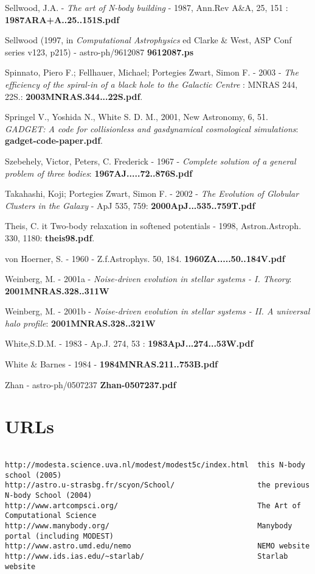 Sellwood, J.A. - {\it The art of N-body building} - 1987, Ann.Rev A\&A, 25, 151 : 
{\bf 1987ARA+A..25..151S.pdf}



Sellwood (1997, in {\it Computational Astrophysics} 
ed Clarke \& West,  ASP  Conf  series  v123, p215) - astro-ph/9612087
{\bf 9612087.ps}

Spinnato, Piero F.; Fellhauer, Michael; Portegies Zwart, Simon F. - 2003 -
{\it The efficiency of the spiral-in of a black hole to the Galactic Centre} :
MNRAS 244, 22S.: {\bf 2003MNRAS.344...22S.pdf}.

Springel V., Yoshida N., White S. D. M., 2001, New Astronomy, 6, 51. 
{\it GADGET: A code for collisionless and gasdynamical cosmological simulations}:
{\bf gadget-code-paper.pdf}.

Szebehely, Victor, Peters, C. Frederick - 1967 - 
{\it Complete solution of a general problem of three bodies}:
{\bf 1967AJ.....72..876S.pdf}

Takahashi, Koji; Portegies Zwart, Simon F. - 2002 -
{\it The Evolution of Globular Clusters in the Galaxy} - ApJ 535, 759:
{\bf 2000ApJ...535..759T.pdf}

Theis, C. {it  Two-body relaxation in softened potentials} - 1998, Astron.Astroph. 330, 1180:
{\bf theis98.pdf}.

von Hoerner, S. - 1960 - Z.f.Astrophys. 50, 184.
{\bf 1960ZA.....50..184V.pdf}


Weinberg, M. - 2001a - 
{\it Noise-driven evolution in stellar systems - I. Theory}:
{\bf 2001MNRAS.328..311W}

Weinberg, M. - 2001b - 
{\it Noise-driven evolution in stellar systems - II. A universal halo profile}:
{\bf 2001MNRAS.328..321W}


White,S.D.M. - 1983 - Ap.J. 274, 53 : {\bf 1983ApJ...274...53W.pdf}

White \& Barnes - 1984 - {\bf 1984MNRAS.211..753B.pdf}

Zhan - astro-ph/0507237 {\bf Zhan-0507237.pdf}

\section*{URLs}

\begin{verbatim}

http://modesta.science.uva.nl/modest/modest5c/index.html  this N-body school (2005)
http://astro.u-strasbg.fr/scyon/School/                   the previous N-body School (2004)
http://www.artcompsci.org/                                The Art of Computational Science
http://www.manybody.org/                                  Manybody portal (including MODEST)
http://www.astro.umd.edu/nemo                             NEMO website
http://www.ids.ias.edu/~starlab/                          Starlab website

\end{verbatim}


